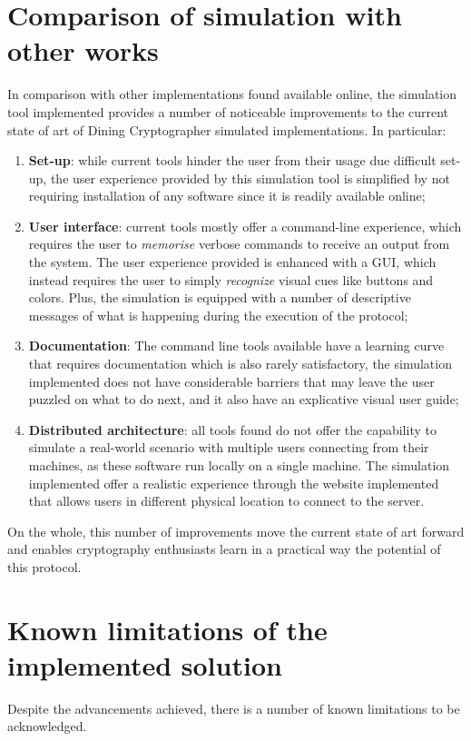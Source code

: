 \section{Comparison of simulation with other works}
In comparison with other implementations found available online, the simulation tool implemented provides a number of noticeable improvements to the current state of art of Dining Cryptographer simulated implementations. In particular:
\begin{enumerate}
    \item \textbf{Set-up}: while current tools hinder the user from their usage due difficult set-up, the user experience provided by this simulation tool is simplified by not requiring installation of any software since it is readily available online;
    \item \textbf{User interface}: current tools mostly offer a command-line experience, which requires the user to \textit{memorise} verbose commands to receive an output from the system. The user experience provided is enhanced with a GUI, which instead requires the user to simply \textit{recognize} visual cues like buttons and colors. Plus, the simulation is equipped with a number of descriptive messages of what is happening during the execution of the protocol;
    \item \textbf{Documentation}: The command line tools available have a learning curve that requires documentation which is also rarely satisfactory, the simulation implemented does not have considerable barriers that may leave the user puzzled on what to do next, and it also have an explicative visual user guide;
    \item \textbf{Distributed architecture}: all tools found do not offer the capability to simulate a real-world scenario with multiple users connecting from their machines, as these software run locally on a single machine. The simulation implemented offer a realistic experience through the website implemented that allows users in different physical location to connect to the server.
\end{enumerate}

On the whole, this number of improvements move the current state of art forward and enables cryptography enthusiasts learn in a practical way the potential of this protocol.

\section{Known limitations of the implemented solution}
Despite the advancements achieved, there is a number of known limitations to be acknowledged. 

